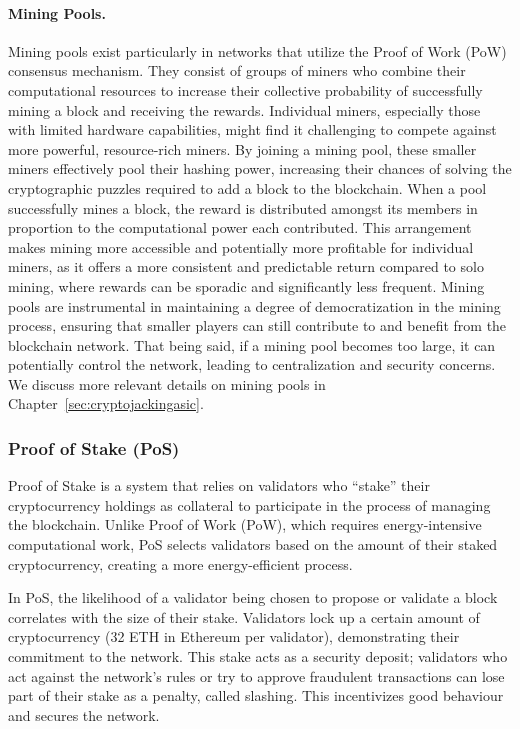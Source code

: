 \paragraph{Mining Pools.}
Mining pools exist particularly in networks that utilize the Proof of Work (PoW) consensus mechanism. They consist of groups of miners who combine their computational resources to increase their collective probability of successfully mining a block and receiving the rewards. Individual miners, especially those with limited hardware capabilities, might find it challenging to compete against more powerful, resource-rich miners. By joining a mining pool, these smaller miners effectively pool their hashing power, increasing their chances of solving the cryptographic puzzles required to add a block to the blockchain. When a pool successfully mines a block, the reward is distributed amongst its members in proportion to the computational power each contributed. This arrangement makes mining more accessible and potentially more profitable for individual miners, as it offers a more consistent and predictable return compared to solo mining, where rewards can be sporadic and significantly less frequent. Mining pools are instrumental in maintaining a degree of democratization in the mining process, ensuring that smaller players can still contribute to and benefit from the blockchain network. That being said, if a mining pool becomes too large, it can potentially control the network, leading to centralization and security concerns. We discuss more relevant details on mining pools in Chapter~\ref{sec:cryptojackingasic}.



\subsubsection{Proof of Stake (PoS)}
Proof of Stake is a system that relies on validators who ``stake'' their cryptocurrency holdings as collateral to participate in the process of managing the blockchain. Unlike Proof of Work (PoW), which requires energy-intensive computational work, PoS selects validators based on the amount of their staked cryptocurrency, creating a more energy-efficient process.

In PoS, the likelihood of a validator being chosen to propose or validate a block correlates with the size of their stake. Validators lock up a certain amount of cryptocurrency (32 ETH in Ethereum per validator), demonstrating their commitment to the network. This stake acts as a security deposit; validators who act against the network's rules or try to approve fraudulent transactions can lose part of their stake as a penalty, called slashing. This incentivizes good behaviour and secures the network. 

